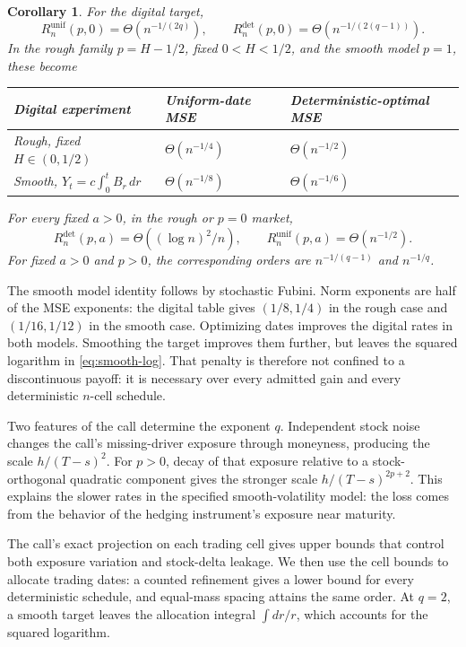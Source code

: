 \documentclass[11pt,a4paper]{amsart}
\theoremstyle{plain}
\newtheorem{corollary}[theorem]{Corollary}
\theoremstyle{definition}
\theoremstyle{remark}
\newcommand{\unif}{\mathrm{unif}}
\newcommand{\detm}{\mathrm{det}}
\begin{document}
\begin{corollary}\label{cor:consequences}
For the digital target,
\[
 R_n^{\unif}(p,0)=\Theta(n^{-1/(2q)}),\qquad
 R_n^{\detm}(p,0)=\Theta(n^{-1/(2(q-1))}).
\]
In the rough family $p=H-1/2$, fixed $0<H<1/2$, and the smooth model $p=1$, these become
\begin{center}
\begin{tabular}{lll}
\toprule
Digital experiment & Uniform-date MSE & Deterministic-optimal MSE\\
\midrule
Rough, fixed $H\in(0,1/2)$ & $\Theta(n^{-1/4})$ & $\Theta(n^{-1/2})$\\
Smooth, $Y_t=c\int_0^tB_r\,dr$ & $\Theta(n^{-1/8})$ & $\Theta(n^{-1/6})$\\
\bottomrule
\end{tabular}
\end{center}
For every fixed $a>0$, in the rough or $p=0$ market,
\begin{equation}\label{eq:smooth-log}
 R_n^{\detm}(p,a)=\Theta((\log n)^2/n),\qquad
 R_n^{\unif}(p,a)=\Theta(n^{-1/2}).
\end{equation}
For fixed $a>0$ and $p>0$, the corresponding orders are $n^{-1/(q-1)}$ and $n^{-1/q}$.
\end{corollary}
The smooth model identity follows by stochastic Fubini. Norm exponents are half of the MSE exponents: the digital table gives $(1/8,1/4)$ in the rough case and $(1/16,1/12)$ in the smooth case. Optimizing dates improves the digital rates in both models. Smoothing the target improves them further, but leaves the squared logarithm in \eqref{eq:smooth-log}. That penalty is therefore not confined to a discontinuous payoff: it is necessary over every admitted gain and every deterministic $n$-cell schedule.

Two features of the call determine the exponent $q$. Independent stock noise changes the call's missing-driver exposure through moneyness, producing the scale $h/(T-s)^2$. For $p>0$, decay of that exposure relative to a stock-orthogonal quadratic component gives the stronger scale $h/(T-s)^{2p+2}$. This explains the slower rates in the specified smooth-volatility model: the loss comes from the behavior of the hedging instrument's exposure near maturity.

The call's exact projection on each trading cell gives upper bounds that control both exposure variation and stock-delta leakage. We then use the cell bounds to allocate trading dates: a counted refinement gives a lower bound for every deterministic schedule, and equal-mass spacing attains the same order. At $q=2$, a smooth target leaves the allocation integral $\int dr/r$, which accounts for the squared logarithm.
\end{document}
